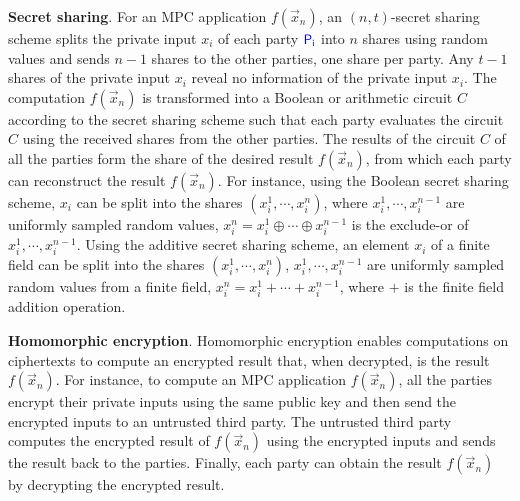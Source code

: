 \smallskip
\noindent
{\bf Secret sharing}. For an MPC application $f(\vec{x}_n)$, an $(n,t)$-secret sharing scheme   splits the private input $x_i$ of each party ${\textcolor{blue}{\sf P_{i}}}$
into $n$ shares using random values and sends $n-1$ shares to the other parties, one share per party.
Any $t-1$ shares of the private input $x_i$ reveal no information of the private input $x_i$.
The computation $f(\vec{x}_n)$  is transformed into a Boolean or arithmetic circuit $C$ according to the secret sharing scheme
such that each party evaluates the circuit $C$ using the received shares from the other parties.
The results of the circuit $C$ of all the parties form
the share of the desired result $f(\vec{x}_n)$, from which
each party can reconstruct the result $f(\vec{x}_n)$.
For instance, using the Boolean secret sharing scheme, $x_i$ can be split into
the shares $(x_i^1,\cdots,x_i^n)$, where $x_i^1,\cdots,x_i^{n-1}$ are uniformly sampled
random values, $x_i^n=x_i^1\oplus \cdots\oplus x_i^{n-1}$ is the exclude-or of $x_i^1,\cdots,x_i^{n-1}$.
Using the additive secret sharing scheme, an element $x_i$ of a finite field can be split into
the shares $(x_i^1,\cdots,x_i^n)$,  $x_i^1,\cdots,x_i^{n-1}$ are uniformly sampled
random values from a finite field, $x_i^n=x_i^1+ \cdots+ x_i^{n-1}$, where $+$ is the finite field addition operation.

\medskip
\noindent
{\bf Homomorphic encryption}.
Homomorphic encryption enables computations on ciphertexts to compute
an encrypted result that, when decrypted, is the result $f(\vec{x}_n)$.
For instance, to compute an MPC application $f(\vec{x}_n)$,
all the parties encrypt their private inputs using the same public key
and then send the encrypted inputs to an untrusted third party.
The untrusted third party computes the encrypted result of $f(\vec{x}_n)$
using the encrypted inputs and sends the result back to the parties.
Finally, each party can obtain the result $f(\vec{x}_n)$ by decrypting
the encrypted result.


%
%



